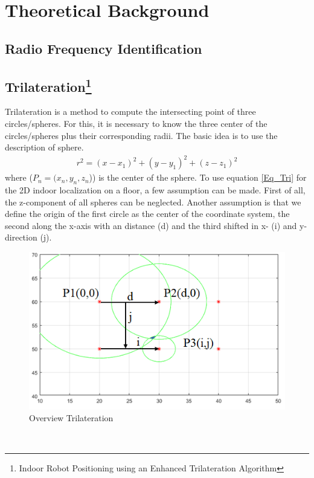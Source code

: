 \section{Theoretical Background} 

\subsection{Radio Frequency Identification}

\subsection[Trilateration]{Trilateration\footnote{Indoor Robot Positioning using an Enhanced Trilateration Algorithm}}
Trilateration is a method to compute the intersecting point of three circles/spheres. For this, it is necessary to know the three center of the circles/spheres plus their corresponding radii. The basic idea is to use the description of sphere.
\begin{align}
r^2 = (x-x_1)^2 + (y-y_1)^2 + (z-z_1)^2  
\end{align}\label{Eq_Tri}  
where ($P_n=(x_n,y_n,z_n$)) is the center of the sphere. To use equation \ref{Eq_Tri} for the 2D indoor localization on a floor, a few assumption can be made. First of all, the z-component of all spheres can be neglected. Another assumption is that we define the origin of the first circle as the center of the coordinate system, the second along the x-axis with an distance (d) and the third shifted in x- (i) and y-direction (j). 
\begin{figure}[!htbp]
 \centering
 \includegraphics[width = 13cm]{Pictures/Trilateration_1}
 \caption{Overview Trilateration}
 \label{Tri_1}
 \end{figure}\\ 
